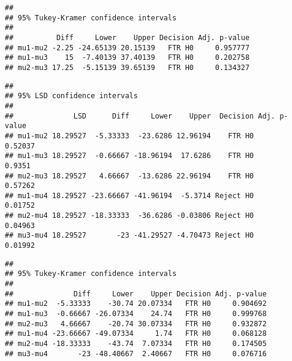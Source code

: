 \documentclass[]{article}
\newenvironment{Shaded}{\begin{snugshade}}{\end{snugshade}}
\newcommand{\CommentTok}[1]{\textcolor[rgb]{0.56,0.35,0.01}{\textit{#1}}}
\newcommand{\DataTypeTok}[1]{\textcolor[rgb]{0.13,0.29,0.53}{#1}}
\newcommand{\FloatTok}[1]{\textcolor[rgb]{0.00,0.00,0.81}{#1}}
\newcommand{\KeywordTok}[1]{\textcolor[rgb]{0.13,0.29,0.53}{\textbf{#1}}}
\newcommand{\NormalTok}[1]{#1}
\newcommand{\OperatorTok}[1]{\textcolor[rgb]{0.81,0.36,0.00}{\textbf{#1}}}
\newcommand{\OtherTok}[1]{\textcolor[rgb]{0.56,0.35,0.01}{#1}}
\newcommand{\StringTok}[1]{\textcolor[rgb]{0.31,0.60,0.02}{#1}}
\begin{document}
\begin{verbatim}
## 
## 95% Tukey-Kramer confidence intervals 
## 
##          Diff     Lower    Upper Decision Adj. p-value
## mu1-mu2 -2.25 -24.65139 20.15139   FTR H0     0.957777
## mu1-mu3    15  -7.40139 37.40139   FTR H0     0.202758
## mu2-mu3 17.25  -5.15139 39.65139   FTR H0     0.134327
\end{verbatim}

\begin{Shaded}
\end{Shaded}

\begin{verbatim}
## 
## 95% LSD confidence intervals 
## 
##              LSD      Diff     Lower    Upper  Decision Adj. p-value
## mu1-mu2 18.29527  -5.33333  -23.6286 12.96194    FTR H0      0.52037
## mu1-mu3 18.29527  -0.66667 -18.96194  17.6286    FTR H0       0.9351
## mu2-mu3 18.29527   4.66667  -13.6286 22.96194    FTR H0      0.57262
## mu1-mu4 18.29527 -23.66667 -41.96194  -5.3714 Reject H0      0.01752
## mu2-mu4 18.29527 -18.33333  -36.6286 -0.03806 Reject H0      0.04963
## mu3-mu4 18.29527       -23 -41.29527 -4.70473 Reject H0      0.01992
\end{verbatim}

\begin{Shaded}
\end{Shaded}

\begin{verbatim}
## 
## 95% Tukey-Kramer confidence intervals 
## 
##              Diff     Lower    Upper Decision Adj. p-value
## mu1-mu2  -5.33333    -30.74 20.07334   FTR H0     0.904692
## mu1-mu3  -0.66667 -26.07334    24.74   FTR H0     0.999768
## mu2-mu3   4.66667    -20.74 30.07334   FTR H0     0.932872
## mu1-mu4 -23.66667 -49.07334     1.74   FTR H0     0.068128
## mu2-mu4 -18.33333    -43.74  7.07334   FTR H0     0.174505
## mu3-mu4       -23 -48.40667  2.40667   FTR H0     0.076716
\end{verbatim}
\end{document}
